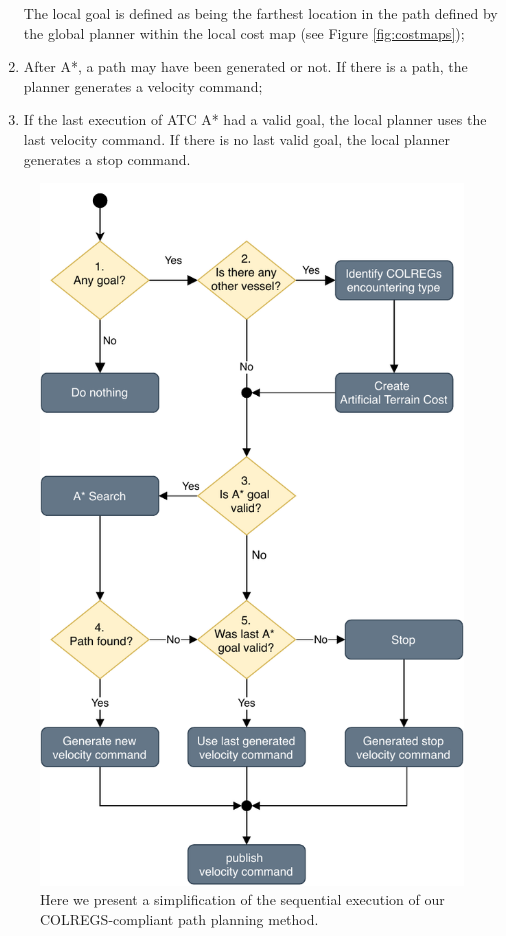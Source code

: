 \begin{enumerate}
                The local goal is defined as being the farthest location in the path defined by the global planner within the local cost map (see Figure \ref{fig:costmaps});
                
                \item After A*, a path may have been generated or not. If there is a path, the planner generates a velocity command;
                
                \item If the last execution of \ac{ATC} A* had a valid goal, the local planner uses the last velocity command. If there is no last valid goal, the local planner generates a stop command.

            \end{enumerate}
        
        \begin{figure}[H]
            \centering
            \includegraphics[scale=0.95]{figs/Chap4/local_planner_flow.pdf}
            \caption{Here we present a simplification of the sequential execution of our \ac{COLREGS}-compliant path planning method.}
            \label{fig:local_planner_flow}
        \end{figure}